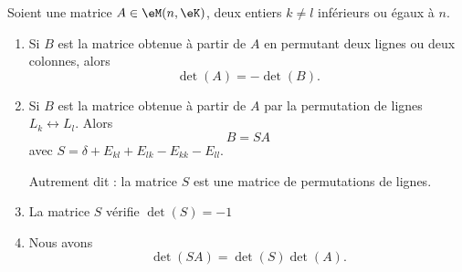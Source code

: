 \begin{proposition}    \label{PROPooFQRDooRPfuxk}
	Soient une matrice \( A\in \eM(n,\eK)\), deux entiers \( k\neq l\) inférieurs ou égaux à \( n\).
	\begin{enumerate}
		\item   \label{ITEMooAIHWooHXzeys}
		      Si \( B\) est la matrice obtenue à partir de \( A\) en permutant deux lignes ou deux colonnes, alors
		      \begin{equation}
			      \det(A)=-\det(B).
		      \end{equation}
		\item  \label{ITEMooDNHWooOMgmxa}
		      Si \( B\) est la matrice obtenue à partir de \( A\) par la permutation de lignes \( L_k\leftrightarrow L_l\). Alors
		      \begin{equation}
			      B=SA
		      \end{equation}
		      avec \( S=\delta+E_{kl}+E_{lk}-E_{kk}-E_{ll}\).

		      Autrement dit : la matrice \( S\) est une matrice de permutations de lignes.
		\item \label{ITEMooSHRQooQrqVdO}
		      La matrice \( S\) vérifie \( \det(S)=-1\)
		\item       \label{ITEMooQXSEooMWiKbL}
		      Nous avons
		      \begin{equation}
			      \det(SA)=\det(S)\det(A).
		      \end{equation}
	\end{enumerate}
\end{proposition}

